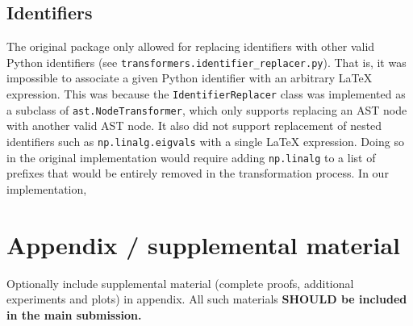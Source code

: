 \documentclass{article}
\begin{document}
\subsection{Identifiers}

The original package only allowed for replacing identifiers with other valid Python identifiers (see \verb|transformers.identifier_replacer.py|).
That is,
it was impossible to associate a given Python identifier with an arbitrary \LaTeX{} expression.
This was because the \verb|IdentifierReplacer| class was implemented as a subclass of \verb|ast.NodeTransformer|,
which only supports replacing an AST node with another valid AST node.
It also did not support replacement of nested identifiers such as \verb|np.linalg.eigvals| with a single LaTeX expression.
Doing so in the original implementation would require adding \verb|np.linalg| to a list of prefixes that would be entirely removed in the transformation process.
In our implementation,


\appendix

\section{Appendix / supplemental material}


Optionally include supplemental material (complete proofs, additional experiments and plots) in appendix.
All such materials \textbf{SHOULD be included in the main submission.}
\end{document}
